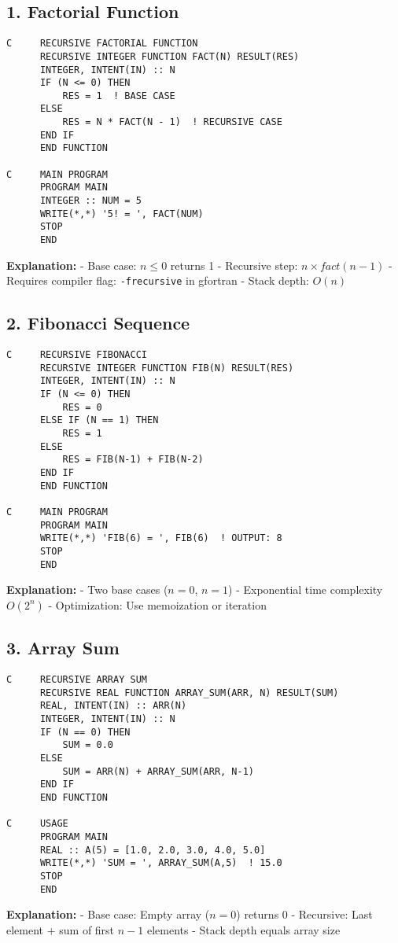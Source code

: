 \documentclass{book}
\begin{document}
\subsection*{1. Factorial Function}
\begin{verbatim}
C     RECURSIVE FACTORIAL FUNCTION
      RECURSIVE INTEGER FUNCTION FACT(N) RESULT(RES)
      INTEGER, INTENT(IN) :: N
      IF (N <= 0) THEN
          RES = 1  ! BASE CASE
      ELSE
          RES = N * FACT(N - 1)  ! RECURSIVE CASE
      END IF
      END FUNCTION

C     MAIN PROGRAM
      PROGRAM MAIN
      INTEGER :: NUM = 5
      WRITE(*,*) '5! = ', FACT(NUM)
      STOP
      END
\end{verbatim}
\textbf{Explanation:}  
- Base case: \( n \leq 0 \) returns 1  
- Recursive step: \( n \times fact(n-1) \)  
- Requires compiler flag: \texttt{-frecursive} in gfortran  
- Stack depth: \( O(n) \)

\subsection*{2. Fibonacci Sequence}
\begin{verbatim}
C     RECURSIVE FIBONACCI
      RECURSIVE INTEGER FUNCTION FIB(N) RESULT(RES)
      INTEGER, INTENT(IN) :: N
      IF (N <= 0) THEN
          RES = 0
      ELSE IF (N == 1) THEN
          RES = 1
      ELSE
          RES = FIB(N-1) + FIB(N-2)
      END IF
      END FUNCTION

C     MAIN PROGRAM
      PROGRAM MAIN
      WRITE(*,*) 'FIB(6) = ', FIB(6)  ! OUTPUT: 8
      STOP
      END
\end{verbatim}
\textbf{Explanation:}  
- Two base cases (\( n=0 \), \( n=1 \))  
- Exponential time complexity \( O(2^n) \)  
- Optimization: Use memoization or iteration  

\subsection*{3. Array Sum}
\begin{verbatim}
C     RECURSIVE ARRAY SUM
      RECURSIVE REAL FUNCTION ARRAY_SUM(ARR, N) RESULT(SUM)
      REAL, INTENT(IN) :: ARR(N)
      INTEGER, INTENT(IN) :: N
      IF (N == 0) THEN
          SUM = 0.0
      ELSE
          SUM = ARR(N) + ARRAY_SUM(ARR, N-1)
      END IF
      END FUNCTION

C     USAGE
      PROGRAM MAIN
      REAL :: A(5) = [1.0, 2.0, 3.0, 4.0, 5.0]
      WRITE(*,*) 'SUM = ', ARRAY_SUM(A,5)  ! 15.0
      STOP
      END
\end{verbatim}
\textbf{Explanation:}  
- Base case: Empty array (\( n=0 \)) returns 0  
- Recursive: Last element + sum of first \( n-1 \) elements  
- Stack depth equals array size  
\end{document}
